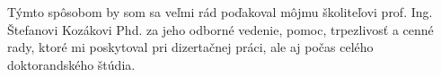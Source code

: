 Týmto spôsobom by som sa veľmi rád poďakoval môjmu školiteľovi prof. Ing. Štefanovi Kozákovi Phd. za jeho odborné vedenie, pomoc, trpezlivosť a cenné rady, ktoré mi poskytoval pri dizertačnej práci, ale aj počas celého doktorandského štúdia. 